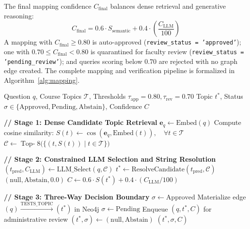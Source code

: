\documentclass[conference]{IEEEtran}
\begin{document}
The final mapping confidence $C_{\mathrm{final}}$ balances dense retrieval and generative reasoning:
\begin{equation}
C_{\mathrm{final}} = 0.6 \cdot S_{\mathrm{semantic}} + 0.4 \cdot \left(\frac{C_{\mathrm{LLM}}}{100}\right)
\end{equation}
A mapping with $C_{\mathrm{final}} \ge 0.80$ is auto-approved (\texttt{review\_status = 'approved'}); one with $0.70 \le C_{\mathrm{final}} < 0.80$ is quarantined for faculty review (\texttt{review\_status = 'pending\_review'}); and queries scoring below $0.70$ are rejected with no graph edge created. The complete mapping and verification pipeline is formalized in Algorithm~\ref{alg:mapping}.

\begin{algorithm}[t]
\caption{Two-Stage Question-to-Topic Mapping with Abstention}
\label{alg:mapping}
\begin{algorithmic}[1]
\Require Question $q$, Course Topics $\mathcal{T}$, Thresholds $\tau_{\text{app}} = 0.80, \tau_{\text{rev}} = 0.70$
\Ensure Topic $t^*$, Status $\sigma \in \{\text{Approved}, \text{Pending}, \text{Abstain}\}$, Confidence $C$

\Statex \textbf{// Stage 1: Dense Candidate Topic Retrieval}
\State $\mathbf{e}_q \gets \text{Embed}(q)$
\State Compute cosine similarity: $S(t) \gets \cos(\mathbf{e}_q, \text{Embed}(t)), \quad \forall t \in \mathcal{T}$
\State $\mathcal{C} \gets \operatorname{Top-}8\big(\{ (t, S(t)) \mid t \in \mathcal{T} \}\big)$

\Statex \textbf{// Stage 2: Constrained LLM Selection and String Resolution}
\State $(t_{\text{pred}}, C_{\text{LLM}}) \gets \text{LLM\_Select}(q, \mathcal{C})$ 
\State $t^* \gets \text{ResolveCandidate}(t_{\text{pred}}, \mathcal{C})$ 
 
    \State \Return $(\mathrm{null}, \text{Abstain}, 0.0)$
\EndIf
\State $C \gets 0.6 \cdot S(t^*) + 0.4 \cdot (C_{\text{LLM}} / 100)$ 

\Statex \textbf{// Stage 3: Three-Way Decision Boundary}
 
    \State $\sigma \gets \text{Approved}$
    \State Materialize edge $(q) \xrightarrow{\text{TESTS\_TOPIC}} (t^*)$ in Neo4j
 
    \State $\sigma \gets \text{Pending}$
    \State Enqueue $(q, t^*, C)$ for administrative review
\Else {}
    \State $(t^*, \sigma) \gets (\mathrm{null}, \text{Abstain})$
\EndIf
\State \Return $(t^*, \sigma, C)$
\end{algorithmic}
\end{algorithm}
\end{document}
